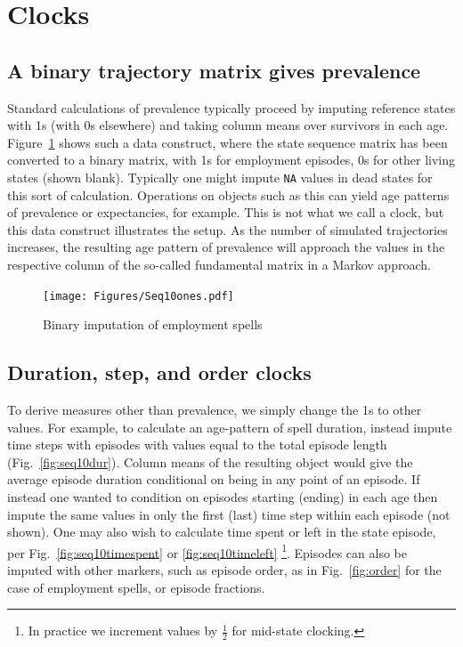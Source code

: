 \documentclass{article}
\begin{document}
\FloatBarrier

\section{Clocks}
\label{sec:clocks}

\subsection{A binary trajectory matrix gives prevalence}
Standard calculations of prevalence typically proceed by imputing reference states with 1s (with 0s elsewhere) and taking column means over survivors in each age. Figure~\ref{fig:seq10ones} shows such a data construct, where the state sequence matrix has been converted to a binary matrix, with 1s for employment episodes, 0s for other living states (shown blank). Typically one might impute \texttt{NA} values in dead states for this sort of calculation. Operations on objects such as this can yield age patterns of prevalence or expectancies, for example. This is not what we call a clock, but this data construct illustrates the setup. As the number of simulated trajectories increases, the resulting age pattern of prevalence will approach the values in the respective column of the so-called fundamental matrix in a Markov approach.

\begin{figure}[ht!]
\centering
\caption{Binary imputation of employment spells}
\label{fig:seq10ones}
\texttt{[image: Figures/Seq10ones.pdf]}
\end{figure}

\subsection{Duration, step, and order clocks}
To derive measures other than prevalence, we simply change the 1s to other values. For example, to calculate an age-pattern of spell duration, instead impute time steps with episodes with values equal to the total episode length (Fig.~\ref{fig:seq10dur}). Column means of the resulting object would give the average episode duration conditional on being in any point of an episode. If instead one wanted to condition on episodes starting (ending) in each age then impute the same values in only the first (last) time step within each episode (not shown). One may also wish to calculate time spent or left in the state episode, per Fig.~\ref{fig:seq10timespent} or \ref{fig:seq10timeleft} \footnote{In practice we increment values by $\frac{1}{2}$ for mid-state clocking.}. Episodes can also be imputed with other markers, such as episode order, as in Fig.~\ref{fig:order} for the case of employment spells, or episode fractions. 
\end{document}
